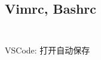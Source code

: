 \documentclass[titlepage, a4paper, 11pt]{article}
\begin{document}
\begin{spacing}{1.15}
				\subsection*{Vimrc, Bashrc}
				\inputminted{vim}{src/Miscellany/vimrc}
				\inputminted{sh}{src/Miscellany/bashrc}
				VSCode: 打开自动保存

		\end{spacing}
\end{document}
